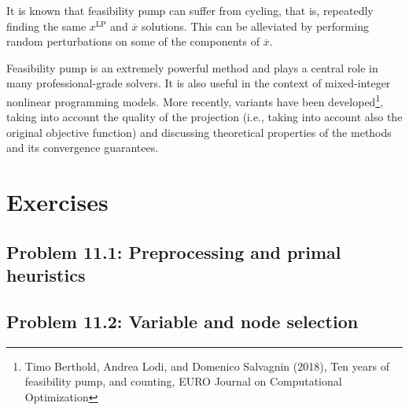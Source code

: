 It is known that feasibility pump can suffer from cycling, that is, repeatedly finding the same $x^{\text{LP}}$ and $\overline{x}$ solutions. This can be alleviated by performing random perturbations on some of the components of $\overline{x}$.

Feasibility pump is an extremely powerful method and plays a central role in many professional-grade solvers. It is also useful in the context of mixed-integer nonlinear programming models. More recently, variants have been developed\footnote{Timo Berthold, Andrea Lodi, and Domenico Salvagnin (2018), Ten years of feasibility pump, and counting, EURO Journal on Computational Optimization}, taking into account the quality of the projection (i.e., taking into account also the original objective function) and discussing theoretical properties of the methods and its convergence guarantees. 


\pagebreak

\section{Exercises}


\subsection*{Problem 11.1: Preprocessing and primal heuristics}


\subsection*{Problem 11.2: Variable and node selection}






